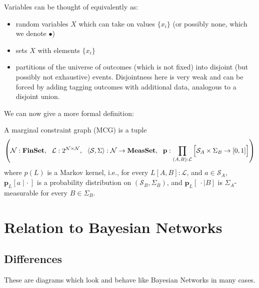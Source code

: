 \documentclass{article}
\begin{document}
	Variables can be thought of equivalently as:
	\begin{itemize}[nosep]
		\item random variables $X$ which can take on values $\{x_i\}$ (or possibly none, which we denote $\bullet$)
		\item sets $X$ with elements $\{x_i\}$
		\item partitions of the universe of outcomes (which is not fixed) into disjoint (but possibly not exhaustive) events. Disjointness here is very weak and can be forced by adding tagging outcomes with additional data, analogous to a disjoint union.
	\end{itemize}
	
	
	
	
	We can now give a more formal definition:
	\begin{defn}\label{def:mcg}
		A marginal constraint graph (MCG) is a tuple 
		\[ \left(\mathcal N : \mathbf{FinSet},~~\mathcal L : 2^{\cal N \times N},~~ \langle\mathcal S, \Sigma\rangle : \mathcal N \to \mathbf{MeasSet}, ~~\mathbf p : \prod_{(A,B): \mathcal L} \left[ \Big. \mathcal S_A \times \Sigma_B \to [0,1]\right] \right) \]
		where $p(L)$ is a Markov kernel, i.e., for every $L[A,B] : \mathcal L$, and $a \in \mathcal S_A$, $\mathbf p_L[a \mid \cdot~]$ is a probability distribution on $(\mathcal S_B, \Sigma_B)$, and $\mathbf p_L[~\cdot \mid B]$ is $\Sigma_A$-measurable for every $B \in \Sigma_B$.
	\end{defn}
		


	\section{Relation to Bayesian Networks}
	
	\subsection{Differences}
	These are diagrams which look and behave like Bayesian Networks in many cases.
	
\end{document}

